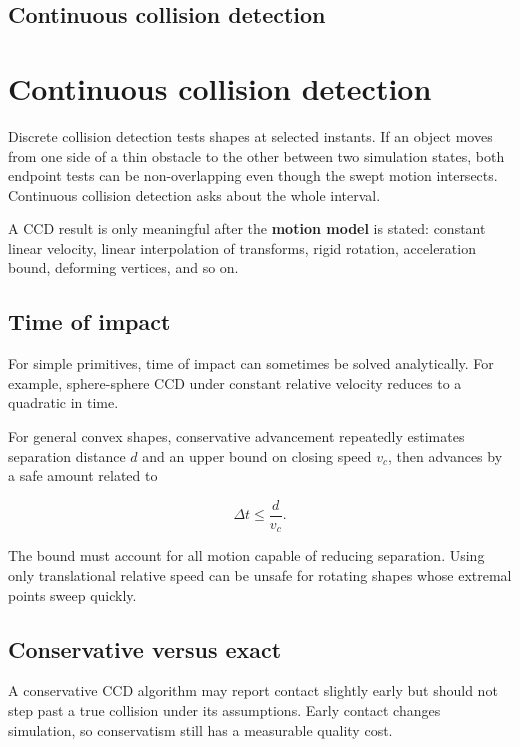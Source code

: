 \hypertarget{appendix-66956ed6c753}{}
\section*{Continuous collision detection}
\chapter{Continuous collision detection}\label{appendix-66956ed6c753-continuous-collision-detection}

Discrete collision detection tests shapes at selected instants. If an object moves from one side of a thin obstacle to the other between two simulation states, both endpoint tests can be non-overlapping even though the swept motion intersects. Continuous collision detection asks about the whole interval.

A CCD result is only meaningful after the \textbf{motion model} is stated: constant linear velocity, linear interpolation of transforms, rigid rotation, acceleration bound, deforming vertices, and so on.

\section{Time of impact}\label{appendix-66956ed6c753-time-of-impact}

For simple primitives, time of impact can sometimes be solved analytically. For example, sphere-sphere CCD under constant relative velocity reduces to a quadratic in time.

For general convex shapes, conservative advancement repeatedly estimates separation distance \(d\) and an upper bound on closing speed \(v_c\), then advances by a safe amount related to

\[
\Delta t\le \frac{d}{v_c}.
\]

The bound must account for all motion capable of reducing separation. Using only translational relative speed can be unsafe for rotating shapes whose extremal points sweep quickly.

\section{Conservative versus exact}\label{appendix-66956ed6c753-conservative-versus-exact}

A conservative CCD algorithm may report contact slightly early but should not step past a true collision under its assumptions. Early contact changes simulation, so conservatism still has a measurable quality cost.

